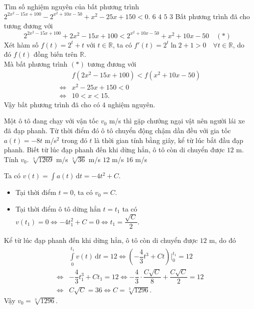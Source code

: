 \begin{ex}%
	Tìm số nghiệm nguyên của bất phương trình
	$ 2^{2x^2-15x+100}-2^{x^2+10x-50} +x^2-25x+150<0.$
	\choice
	{$6$}
	{\True $4$}
	{$5$}
	{$3$}
	\loigiai
	{Bất phương trình đã cho tương đương với 
	$$2^{2x^2-15x+100}+2x^2-15x+100<2^{x^2+10x-50}+x^2+10x-50\quad (*)$$
	Xét hàm số $f(t)=2^t+t$ với $t\in \mathbb{R}$, ta có $f'(t)=2^t\ln 2+1>0\quad \forall t \in \mathbb{R}$, do đó $f(t)$ đồng biến trên $\mathbb{R}.$\\
	Mà bất phương trình $(*) $ tương đương với
	\begin{eqnarray*}
	&&f(2x^2-15x+100)<f(x^2+10x-50)\\
	&\Leftrightarrow & x^2-25x+150<0\\
	& \Leftrightarrow & 10<x<15.
	\end{eqnarray*}
	Vậy bất phương trình đã cho có $4$ nghiệm nguyên.
	}
\end{ex}

\begin{ex}%
	Một ô tô đang chạy với vận tốc $v_0$ m/s thì gặp chướng ngại vật nên người lái xe đã đạp phanh. Từ thời điểm đó ô tô chuyển động chậm dần đều với gia tốc  $a(t) =-8t$ m/s$^2$ trong đó  $t$ là thời gian tính bằng giây, kể từ lúc bắt đầu đạp phanh. Biết từ lúc đạp phanh đến khi dừng hẳn, ô tô còn di chuyển được $12$ m. Tính $v_0$.
		\choice
	{\True $\sqrt[3]{1269}$ m/s}
	{$\sqrt[3]{36}$ m/s}
	{$12$ m/s}
	{$16$ m/s}
	\loigiai
	{Ta có $v(t)= \displaystyle\int\limits a(t)\mathrm{\,d}t = -4t^2+C.$
		\begin{itemize}
			\item Tại thời điểm $t=0$, ta có $v_0=C$.
			\item Tại thời điểm ô tô dừng hẳn $t=t_1$ ta có $v(t_1)=0 \Leftrightarrow -4t_1^2+C=0 \Leftrightarrow t_1=\dfrac{\sqrt{C}}{2}.$
		\end{itemize}
	Kể từ lúc đạp phanh đến khi dừng hẳn, ô tô còn di chuyển được $12$ m, do đó 
	\begin{eqnarray*}
	&&  \displaystyle\int\limits_0^{t_1} v(t)\mathrm{\,d}t =12
	\Leftrightarrow \left( -\dfrac{4}{3}t^3+Ct\right)\bigg|_0^{t_1}=12\\
	&\Leftrightarrow & -\dfrac{4}{3}t_1^3+Ct_1=12 \Leftrightarrow -\dfrac{4}{3} \cdot \dfrac{C\sqrt{C}}{8}+\dfrac{C\sqrt{C}}{2}=12\\
	&\Leftrightarrow & C\sqrt{C}=36 \Leftrightarrow C=\sqrt[3]{1296}.
	\end{eqnarray*}
Vậy $v_0=\sqrt[3]{1296}$.
	}
\end{ex}

